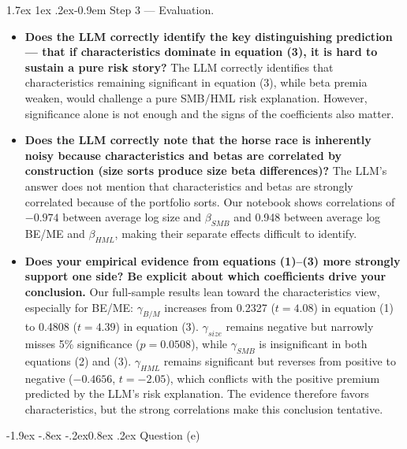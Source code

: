 \documentclass[11pt]{article}
\makeatletter
\renewcommand\subsubsection{\@startsection{subsubsection}{3}{0pt}%
  {-1.9ex \@plus -.8ex \@minus -.2ex}{0.8ex \@plus .2ex}%
  {\normalfont\bfseries\itshape\normalsize\color{psink}}}
\renewcommand\paragraph{\@startsection{paragraph}{4}{0pt}%
  {1.7ex \@plus 1ex \@minus .2ex}{-0.9em}%
  {\normalfont\bfseries\normalsize\color{psink}}}
\newenvironment{tight}
  {\begin{itemize}\setlength{\itemsep}{3pt}\setlength{\parskip}{0pt}%
   \setlength{\topsep}{3pt}\setlength{\leftmargini}{1.4em}}
  {\end{itemize}}
\makeatother
\begin{document}
\paragraph{Step 3 --- Evaluation.}
\begin{tight}
  \item \textbf{Does the LLM correctly identify the key distinguishing prediction --- that
  if characteristics dominate in equation (3), it is hard to sustain a pure risk story?}
  The LLM correctly identifies that characteristics remaining significant in equation (3),
  while beta premia weaken, would challenge a pure SMB/HML risk explanation. However,
  significance alone is not enough and the signs of the coefficients also matter.
  \item \textbf{Does the LLM correctly note that the horse race is inherently noisy because
  characteristics and betas are correlated by construction (size sorts produce size beta
  differences)?} The LLM's answer does not mention that characteristics and betas are
  strongly correlated because of the portfolio sorts. Our notebook shows correlations of
  $-0.974$ between average log size and $\beta_{SMB}$ and 0.948 between average log BE/ME
  and $\beta_{HML}$, making their separate effects difficult to identify.
  \item \textbf{Does your empirical evidence from equations (1)--(3) more strongly support
  one side? Be explicit about which coefficients drive your conclusion.} Our full-sample
  results lean toward the characteristics view, especially for BE/ME: $\gamma_{B/M}$
  increases from 0.2327 ($t=4.08$) in equation (1) to 0.4808 ($t=4.39$) in equation (3).
  $\gamma_{size}$ remains negative but narrowly misses 5\% significance ($p=0.0508$), while
  $\gamma_{SMB}$ is insignificant in both equations (2) and (3). $\gamma_{HML}$ remains
  significant but reverses from positive to negative ($-0.4656$, $t=-2.05$), which
  conflicts with the positive premium predicted by the LLM's risk explanation. The evidence
  therefore favors characteristics, but the strong correlations make this conclusion
  tentative.
\end{tight}

\subsubsection{Question (e)}
\end{document}
